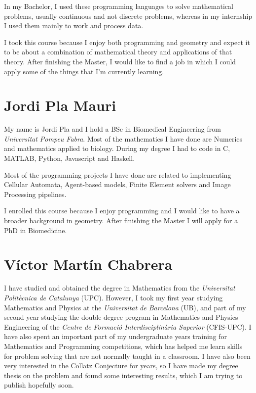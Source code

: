 \documentclass[11pt]{amsart}
\begin{document}
In my Bachelor, I used these programming languages to solve mathematical problems, usually continuous and not discrete problems, whereas in my internship
I used them mainly to work and process data.

I took this course because I enjoy both programming and geometry and expect it to be about a combination of mathematical theory and applications of that theory.
After finishing the Master, I would like to find a job in which I could apply some of the things that I'm currently learning.


\medskip

\section*{Jordi Pla Mauri}

My name is Jordi Pla and I hold a BSc in Biomedical Engineering from
\textit{Universitat Pompeu Fabra}.
Most of the mathematics I have done are Numerics and
mathematics applied to biology.
During my degree I had to code in C, MATLAB, Python, Javascript and Haskell.

Most of the programming projects I have done are related to implementing
Cellular Automata, Agent-based models, Finite Element solvers
and Image Processing pipelines.

I enrolled this course because I enjoy programming
and I would like to have a broader background in geometry.
After finishing the Master I will apply for a PhD in Biomedicine.

\section*{Víctor Martín Chabrera}

I have studied and obtained the degree in Mathematics from the \textit{Universitat Politècnica de Catalunya} (UPC). However, I took my first year studying Mathematics and Physics at the \textit{Universitat de Barcelona} (UB), and part of my second year studying the double degree program in Mathematics and Physics Engineering of the \textit{Centre de Formació Interdisciplinària Superior} (CFIS-UPC). I have also spent an important part of my undergraduate years training for Mathematics and Programming competitions, which has helped me learn skills for problem solving that are not normally taught in a classroom. I have also been very interested in the Collatz Conjecture for years, so I have made my degree thesis on the problem and found some interesting results, which I am trying to publish hopefully soon. 
\end{document}
